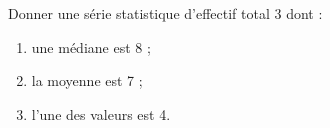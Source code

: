 
Donner une série statistique d’effectif total 3 dont :
\begin{enumerate}
\item une médiane est 8 ;
\item la moyenne est 7 ;
\item l’une des valeurs est 4.
\end{enumerate}
 